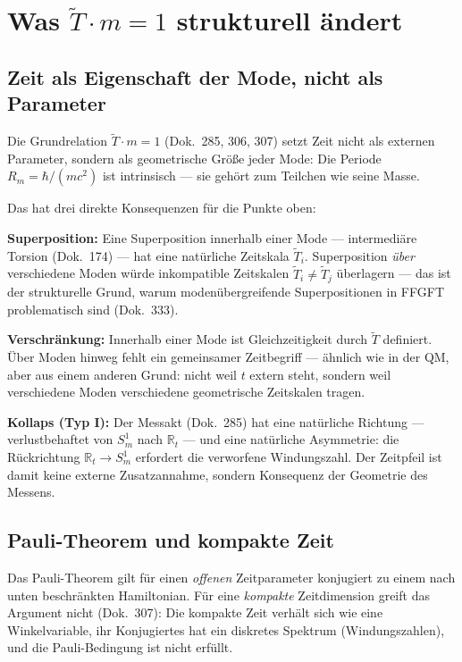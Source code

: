 \section{Was $\tilde{T}\cdot m = 1$ strukturell ändert}

\subsection{Zeit als Eigenschaft der Mode, nicht als Parameter}

Die Grundrelation $\tilde{T}\cdot m = 1$ (Dok.~285, 306, 307)
setzt Zeit nicht als externen Parameter, sondern als
geometrische Größe jeder Mode: Die Periode $R_m = \hbar/(mc^2)$
ist intrinsisch — sie gehört zum Teilchen wie seine Masse.

Das hat drei direkte Konsequenzen für die Punkte oben:

\textbf{Superposition:} Eine Superposition innerhalb einer
Mode — intermediäre Torsion (Dok.~174) — hat eine natürliche
Zeitskala $\tilde{T}_i$. Superposition \emph{über} verschiedene
Moden würde inkompatible Zeitskalen $\tilde{T}_i \neq \tilde{T}_j$
überlagern — das ist der strukturelle Grund, warum
modenübergreifende Superpositionen in FFGFT problematisch sind
(Dok.~333).

\textbf{Verschränkung:} Innerhalb einer Mode ist
Gleichzeitigkeit durch $\tilde{T}$ definiert. Über Moden
hinweg fehlt ein gemeinsamer Zeitbegriff — ähnlich wie in
der QM, aber aus einem anderen Grund: nicht weil $t$ extern
steht, sondern weil verschiedene Moden verschiedene
geometrische Zeitskalen tragen.

\textbf{Kollaps (Typ I):} Der Messakt (Dok.~285) hat eine
natürliche Richtung — verlustbehaftet von $S^1_m$ nach
$\mathbb{R}_t$ — und eine natürliche Asymmetrie: die Rückrichtung
$\mathbb{R}_t \to S^1_m$ erfordert die verworfene Windungszahl.
Der Zeitpfeil ist damit keine externe Zusatzannahme, sondern
Konsequenz der Geometrie des Messens.

\subsection{Pauli-Theorem und kompakte Zeit}

Das Pauli-Theorem gilt für einen \emph{offenen} Zeitparameter
konjugiert zu einem nach unten beschränkten Hamiltonian. Für
eine \emph{kompakte} Zeitdimension greift das Argument nicht
(Dok.~307): Die kompakte Zeit verhält sich wie eine
Winkelvariable, ihr Konjugiertes hat ein diskretes Spektrum
(Windungszahlen), und die Pauli-Bedingung ist nicht erfüllt.

